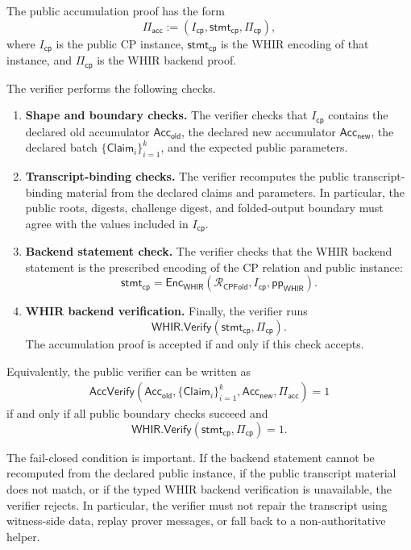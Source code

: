 \documentclass[11pt]{article}
\theoremstyle{definition}
\newcommand{\WHIR}{\mathsf{WHIR}}
\newcommand{\Acc}{\mathsf{Acc}}
\newcommand{\Verify}{\mathsf{Verify}}
\newcommand{\Rcp}{\mathcal{R}_{\mathsf{CPFold}}}
\begin{document}
The public accumulation proof has the form
\[
  \Pi_{\mathsf{acc}}
  :=
  \left(
    I_{\mathsf{cp}},
    \mathsf{stmt}_{\mathsf{cp}},
    \Pi_{\mathsf{cp}}
  \right),
\]
where \(I_{\mathsf{cp}}\) is the public CP instance,
\(\mathsf{stmt}_{\mathsf{cp}}\) is the WHIR encoding of that instance, and
\(\Pi_{\mathsf{cp}}\) is the WHIR backend proof.

The verifier performs the following checks.

\begin{enumerate}
  \item \textbf{Shape and boundary checks.}
  The verifier checks that \(I_{\mathsf{cp}}\) contains the declared old
  accumulator \(\Acc_{\mathsf{old}}\), the declared new accumulator
  \(\Acc_{\mathsf{new}}\), the declared batch
  \(\{\mathsf{Claim}_i\}_{i=1}^k\), and the expected public parameters.

  \item \textbf{Transcript-binding checks.}
  The verifier recomputes the public transcript-binding material from the
  declared claims and parameters. In particular, the public roots, digests,
  challenge digest, and folded-output boundary must agree with the values
  included in \(I_{\mathsf{cp}}\).

  \item \textbf{Backend statement check.}
  The verifier checks that the WHIR backend statement is the prescribed encoding
  of the CP relation and public instance:
  \[
    \mathsf{stmt}_{\mathsf{cp}}
    =
    \mathsf{Enc}_{\WHIR}
    \left(
      \Rcp,
      I_{\mathsf{cp}},
      \mathsf{pp}_{\WHIR}
    \right).
  \]

  \item \textbf{WHIR backend verification.}
  Finally, the verifier runs
  \[
    \WHIR.\Verify(\mathsf{stmt}_{\mathsf{cp}},\Pi_{\mathsf{cp}}).
  \]
  The accumulation proof is accepted if and only if this check accepts.
\end{enumerate}

Equivalently, the public verifier can be written as
\[
\begin{aligned}
\mathsf{AccVerify}(
  \Acc_{\mathsf{old}},
  \{\mathsf{Claim}_i\}_{i=1}^k,
  \Acc_{\mathsf{new}},
  \Pi_{\mathsf{acc}}
)
=1
\end{aligned}
\]
if and only if all public boundary checks succeed and
\[
  \WHIR.\Verify(\mathsf{stmt}_{\mathsf{cp}},\Pi_{\mathsf{cp}})=1.
\]

The fail-closed condition is important. If the backend statement cannot be
recomputed from the declared public instance, if the public transcript material
does not match, or if the typed WHIR backend verification is unavailable, the
verifier rejects. In particular, the verifier must not repair the transcript
using witness-side data, replay prover messages, or fall back to a
non-authoritative helper.
\end{document}
